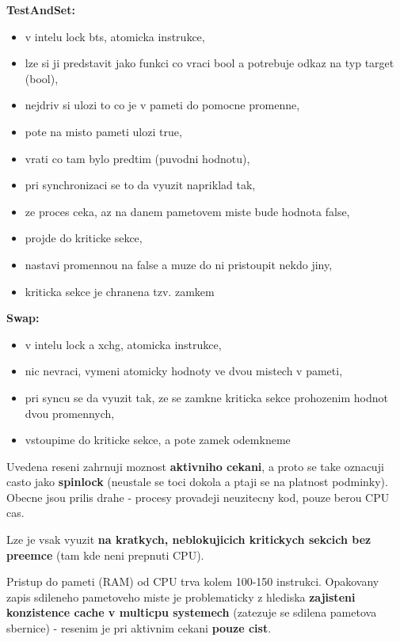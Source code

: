 \documentclass[a4paper, 11pt]{article}
\begin{document}
\textbf{TestAndSet:}
\begin{itemize}
    \item v intelu lock bts, atomicka instrukce,
    \item lze si ji predstavit jako funkci co vraci bool a potrebuje odkaz na typ target (bool),
    \item nejdriv si ulozi to co je v pameti do pomocne promenne,
    \item pote na misto pameti ulozi true, 
    \item vrati co tam bylo predtim (puvodni hodnotu),
    \item pri synchronizaci se to da vyuzit napriklad tak, 
    \item ze proces ceka, az na danem pametovem miste bude hodnota false,
    \item projde do kriticke sekce,
    \item nastavi promennou na false a muze do ni pristoupit nekdo jiny,
    \item kriticka sekce je chranena tzv. zamkem \\
\end{itemize}

\textbf{Swap:}
\begin{itemize}
    \item v intelu lock a xchg, atomicka instrukce,
    \item nic nevraci, vymeni atomicky hodnoty ve dvou mistech v pameti,
    \item pri syncu se da vyuzit tak, ze se zamkne kriticka sekce prohozenim hodnot dvou promennych,
    \item vstoupime do kriticke sekce, a pote zamek odemkneme \\
\end{itemize}

Uvedena reseni zahrnuji moznost \textbf{aktivniho cekani}, a proto se take oznacuji casto jako \textbf{spinlock} (neustale se toci dokola a ptaji se na platnost podminky). Obecne jsou prilis drahe - procesy provadeji neuzitecny kod, pouze berou CPU cas. 

Lze je vsak vyuzit \textbf{na kratkych, neblokujicich kritickych sekcich bez preemce} (tam kde neni prepnuti CPU).

Pristup do pameti (RAM) od CPU trva kolem 100-150 instrukci. Opakovany zapis sdileneho pametoveho miste je problematicky z hlediska \textbf{zajisteni konzistence cache v multicpu systemech} (zatezuje se sdilena pametova sbernice) - resenim je pri aktivnim cekani \textbf{pouze cist}.
\end{document}
